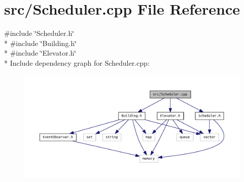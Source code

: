 \section{src/\+Scheduler.cpp File Reference}
\label{_scheduler_8cpp}
{\ttfamily \#include \char`\"{}Scheduler.\+h\char`\"{}}\\*
{\ttfamily \#include \char`\"{}Building.\+h\char`\"{}}\\*
{\ttfamily \#include \char`\"{}Elevator.\+h\char`\"{}}\\*
Include dependency graph for Scheduler.\+cpp\+:
\nopagebreak
\begin{figure}[H]
\begin{center}
\leavevmode
\includegraphics[width=350pt]{_scheduler_8cpp__incl}
\end{center}
\end{figure}

